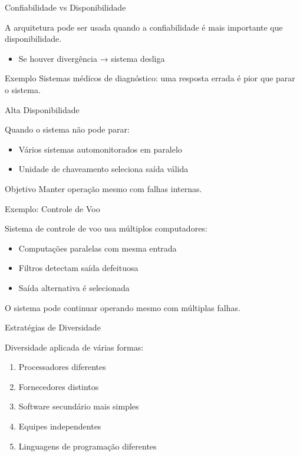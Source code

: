 \documentclass[9pt]{beamer}
\begin{document}
\begin{frame}{Confiabilidade vs Disponibilidade}
\small

A arquitetura pode ser usada quando a confiabilidade é mais importante que disponibilidade.

\begin{itemize}
    \item Se houver divergência → sistema desliga
\end{itemize}

\begin{block}{Exemplo}
Sistemas médicos de diagnóstico:
uma resposta errada é pior que parar o sistema.
\end{block}

\end{frame}
\begin{frame}{Alta Disponibilidade}
\small

Quando o sistema não pode parar:

\begin{itemize}
    \item Vários sistemas automonitorados em paralelo
    \item Unidade de chaveamento seleciona saída válida
\end{itemize}

\begin{block}{Objetivo}
Manter operação mesmo com falhas internas.
\end{block}

\end{frame}
\begin{frame}{Exemplo: Controle de Voo}
\small

Sistema de controle de voo usa múltiplos computadores:

\begin{itemize}
    \item Computações paralelas com mesma entrada
    \item Filtros detectam saída defeituosa
    \item Saída alternativa é selecionada
\end{itemize}

O sistema pode continuar operando mesmo com múltiplas falhas.

\end{frame}
\begin{frame}{Estratégias de Diversidade}
\small

Diversidade aplicada de várias formas:

\begin{enumerate}
    \item Processadores diferentes
    \item Fornecedores distintos
    \item Software secundário mais simples
    \item Equipes independentes
    \item Linguagens de programação diferentes
\end{enumerate}

\end{frame}
\end{document}
